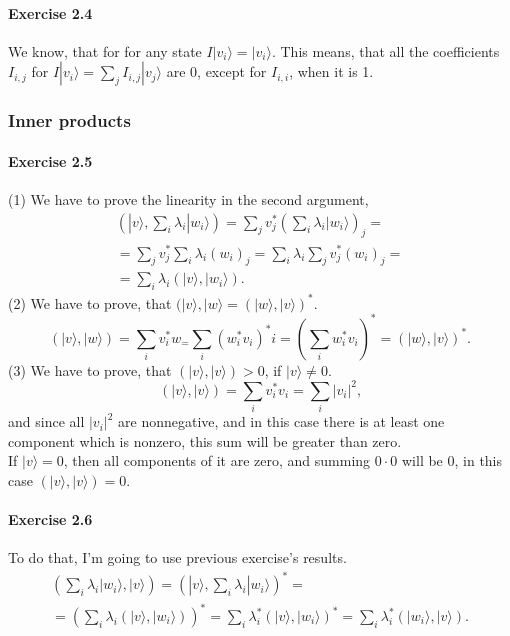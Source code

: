 \documentclass[a4paper,12pt]{article}
\newcommand{\exercise}[1]{\paragraph{Exercise #1}}
\newcommand{\ra}{\rangle}
\begin{document}
    \exercise{2.4} We know, that for for any state $I | v_i \ra = | v_i \ra$. This means, that all the coefficients $I_{i, j}$ for $I | v_i \ra = \sum_j I_{i, j} | v_j \ra$ are 0, except for $I_{i, i}$, when it is 1.

    \setcounter{subsubsection}{3}
    \subsubsection{Inner products}

    \exercise{2.5} (1) We have to prove the linearity in the second argument,
    \begin{gather}
        \nonumber
        \left(| v \ra, \sum_i \lambda_i | w_i \ra \right) =
        \sum_j v_j^* \left( \sum_i \lambda_i |  w_i \ra \right)_j = \\
        = \sum_j v_j^* \sum_i \lambda_i (w_i)_j = \sum_i \lambda_i \sum_j v_j^* (w_i)_j = \\
        = \sum_i \lambda_i (| v \ra, | w_i \ra) \textrm{.}
    \end{gather}
    (2) We have to prove, that $(| v \ra, | w \ra = (| w \ra, | v \ra)^*$.
    \begin{equation}
        (| v \ra, | w \ra) = \sum_i v_i^* w_ = \sum_i (w_i^* v_i)^*i = \left( \sum_i w_i^* v_i \right)^* = (| w \ra, | v \ra) ^ * \textrm{.}
    \end{equation}
    (3) We have to prove, that $(| v \ra, | v \ra) > 0$, if $| v \ra \neq 0$.
    \begin{equation}
        (| v \ra, | v \ra) = \sum_i v_i^* v_i = \sum_i |v_i|^2 \textrm{,}
    \end{equation}
    and since all $|v_i|^2$ are nonnegative, and in this case there is at least one component which is nonzero, this sum will be greater than zero.\\
    If $| v \ra = 0$, then all components of it are zero, and summing $0 \cdot 0$ will be 0, in this case $(| v \ra, | v \ra ) = 0$.

    \exercise{2.6} To do that, I'm going to use previous exercise's results. \\
    \begin{gather}
        \left( \sum_i \lambda_i | w_i \ra, | v \ra \right) = \left( | v \ra, \sum_i \lambda_i | w_i \ra \right) ^* = \\
        = \left( \sum_i \lambda_i (| v \ra, | w_i \ra) \right) ^* = \sum_i \lambda_i^* (| v \ra, | w_i \ra) ^* = \sum_i \lambda_i^* (| w_i \ra, | v \ra) \textrm{.}
    \end{gather}
\end{document}
